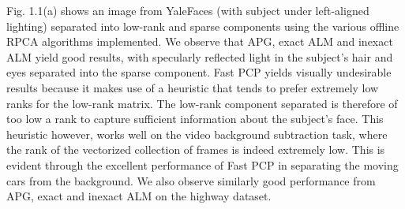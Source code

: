\documentclass[oneside]{article}
\begin{document}
Fig. 1.1(a) shows an image from YaleFaces (with subject under left-aligned lighting) separated into low-rank and sparse components using the various offline RPCA algorithms implemented. We observe that APG, exact ALM and inexact ALM yield good results, with specularly reflected light in the subject's hair and eyes separated into the sparse component. Fast PCP yields visually undesirable results because it makes use of a heuristic that tends to prefer extremely low ranks for the low-rank matrix. The low-rank component separated is therefore of too low a rank to capture sufficient information about the subject's face. This heuristic however, works well on the video background subtraction task, where the rank of the vectorized collection of frames is indeed extremely low. This is evident through the excellent performance of Fast PCP in separating the moving cars from the background. We also observe similarly good performance from APG, exact and inexact ALM on the highway dataset.\newline\newline
\end{document}
